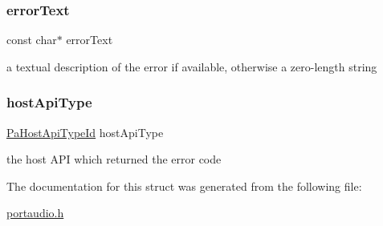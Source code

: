 \subsubsection{\texorpdfstring{error\+Text}{errorText}}
{\footnotesize\ttfamily const char$\ast$ error\+Text}

a textual description of the error if available, otherwise a zero-\/length string \mbox{\label{struct_pa_host_error_info_a4dd82de4eeb322a84395aa4473a9e9eb}} 
\subsubsection{\texorpdfstring{host\+Api\+Type}{hostApiType}}
{\footnotesize\ttfamily \hyperlink{portaudio_8h_a8eaebe3d39c5ea45598da8f86dc2e5ae}{Pa\+Host\+Api\+Type\+Id} host\+Api\+Type}

the host A\+PI which returned the error code 

The documentation for this struct was generated from the following file\+:\begin{DoxyCompactItemize}
\item 
\hyperlink{portaudio_8h}{portaudio.\+h}\end{DoxyCompactItemize}
